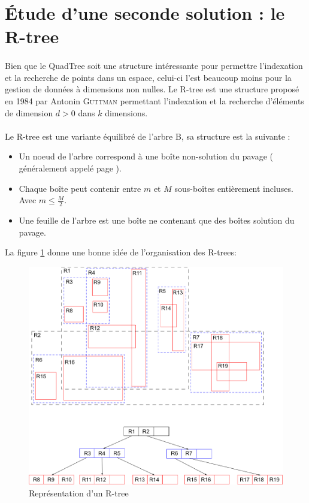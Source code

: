 \section{\'Etude d'une seconde solution : le R-tree}
\paragraph{}Bien que le QuadTree soit une structure intéressante pour permettre l'indexation et la recherche de points dans un espace, celui-ci l'est beaucoup moins pour la gestion de données à dimensions non nulles. Le R-tree est une structure proposé en 1984 par Antonin \textsc{Guttman} permettant l'indexation et la recherche d'éléments de dimension $d > 0$ dans $k$ dimensions\cite{Guttman}.

\paragraph{}Le R-tree est une variante équilibré de l'arbre B, sa structure est la suivante :
\begin{itemize}
 \item Un noeud de l'arbre correspond à une boîte non-solution du pavage ( généralement appelé \og page \fg{}).
 \item Chaque boîte peut contenir entre $m$ et $M$ sous-boîtes entièrement incluses. Avec $m\leq \frac{M}{2}$.
 \item Une feuille de l'arbre est une boîte ne contenant que des boîtes solution du pavage.
\end{itemize}

La figure \ref{fig:rtree} donne une bonne idée de l'organisation des R-trees:
\begin{figure}[htbp]
\centering
\includegraphics[scale=0.50]{rtree}
\caption{Représentation d'un R-tree\cite{wiki}}
\label{fig:rtree}
\end{figure}

